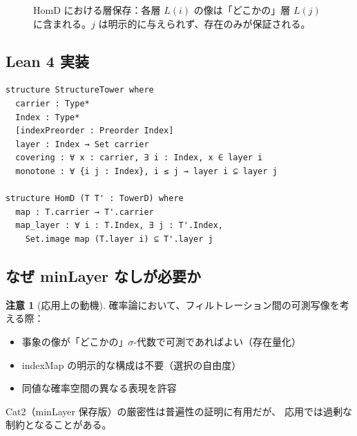\documentclass{ltjsarticle}
\theoremstyle{definition}
\newtheorem{remark}[definition]{注意}
\begin{document}
\begin{figure}[htbp]
\centering
{}
\caption{HomD における層保存：各層 $L(i)$ の像は「どこかの」層 $L(j)$ に含まれる。$j$ は明示的に与えられず、存在のみが保証される。}
\label{fig:homd-layer}
\end{figure}

\subsection{Lean 4 実装}

\begin{leanbox}
\begin{lstlisting}
structure StructureTower where
  carrier : Type*
  Index : Type*
  [indexPreorder : Preorder Index]
  layer : Index → Set carrier
  covering : ∀ x : carrier, ∃ i : Index, x ∈ layer i
  monotone : ∀ {i j : Index}, i ≤ j → layer i ⊆ layer j

structure HomD (T T' : TowerD) where
  map : T.carrier → T'.carrier
  map_layer : ∀ i : T.Index, ∃ j : T'.Index,
    Set.image map (T.layer i) ⊆ T'.layer j
\end{lstlisting}
\end{leanbox}

\subsection{なぜ minLayer なしが必要か}

\begin{remark}[応用上の動機]
確率論において、フィルトレーション間の可測写像を考える際：
\begin{itemize}
  \item 事象の像が「どこかの」$\sigma$-代数で可測であればよい（存在量化）
  \item indexMap の明示的な構成は不要（選択の自由度）
  \item 同値な確率空間の異なる表現を許容
\end{itemize}
Cat2（minLayer 保存版）の厳密性は普遍性の証明に有用だが、
応用では過剰な制約となることがある。
\end{remark}

\end{document}
